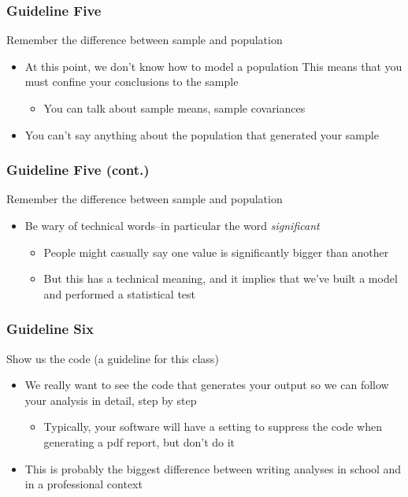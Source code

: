 \documentclass[12pt, block=fill]{beamer}
\begin{document}
\begin{frame}
  \frametitle{Guideline Five}
  \begin{exampleblock}{Remember the difference between sample and population}
    \begin{itemize}
      \item At this point, we don't know how to model a population
      This means that you must confine your conclusions to the sample
      \begin{itemize}
          \item You can talk about sample means, sample covariances
      \end{itemize}
      \item You can't say anything about the population that generated your sample
    \end{itemize}
  \end{exampleblock}
\end{frame}



\begin{frame}
  \frametitle{Guideline Five (cont.)}
  \begin{exampleblock}{Remember the difference between sample and population}
    \begin{itemize}
      \item Be wary of technical words--in particular the word \textit{significant}
      \begin{itemize}
          \item People might casually say one value is significantly bigger than another
          \item But this has a technical meaning, and it implies that we've built a model and performed a statistical test
      \end{itemize}
    \end{itemize}
  \end{exampleblock}
\end{frame}

\begin{frame}
  \frametitle{Guideline Six}
  \begin{exampleblock}{Show us the code (a guideline for this class)}
    \begin{itemize}
      \item We really want to see the code that generates your output so we can follow your analysis in detail, step by step
      \begin{itemize}
          \item Typically, your software will have a setting to suppress the code when generating a pdf report, but don't do it
      \end{itemize}
      \item This is probably the biggest difference between writing analyses in school and in a professional context
    \end{itemize}
  \end{exampleblock}
\end{frame}
\end{document}

